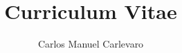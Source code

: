 \usepackage[unicode, bookmarks, colorlinks, breaklinks,
	pdftitle={Manuel Carlevaro - Curriculum Vitae},
	pdfauthor={Manuel Carlevaro},
	pdfproducer={http://carlevaro.ar}
]{hyperref}
\hypersetup{linkcolor=blue,citecolor=blue,filecolor=black,urlcolor=MidnightBlue}
\renewcommand{\labelitemi}{\faAngleRight}


\author{Carlos Manuel Carlevaro}
\title{Curriculum Vitae}
